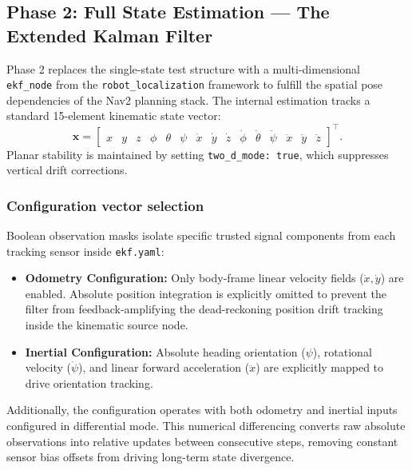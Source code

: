 \subsection{Phase 2: Full State Estimation --- The Extended Kalman Filter}
\label{subsec:ekf}

Phase 2 replaces the single-state test structure with a multi-dimensional \texttt{ekf\_node} from the \texttt{robot\_localization} framework to fulfill the spatial pose dependencies of the Nav2 planning stack. The internal estimation tracks a standard 15-element kinematic state vector:
\begin{equation}
\mathbf{x} = \begin{bmatrix} x & y & z & \phi & \theta & \psi &
\dot{x} & \dot{y} & \dot{z} & \dot{\phi} & \dot{\theta} & \dot{\psi} &
\ddot{x} & \ddot{y} & \ddot{z} \end{bmatrix}^\top.
\end{equation}
Planar stability is maintained by setting \texttt{two\_d\_mode: true}, which suppresses vertical drift corrections.

\subsubsection{Configuration vector selection}

Boolean observation masks isolate specific trusted signal components from each tracking sensor inside \texttt{ekf.yaml}:
\begin{itemize}
\item \textbf{Odometry Configuration:} Only body-frame linear velocity fields ($\dot{x}, \dot{y}$) are enabled. Absolute position integration is explicitly omitted to prevent the filter from feedback-amplifying the dead-reckoning position drift tracking inside the kinematic source node.
\item \textbf{Inertial Configuration:} Absolute heading orientation ($\psi$), rotational velocity ($\dot{\psi}$), and linear forward acceleration ($\ddot{x}$) are explicitly mapped to drive orientation tracking.
\end{itemize}

Additionally, the configuration operates with both odometry and inertial inputs configured in differential mode. This numerical differencing converts raw absolute observations into relative updates between consecutive steps, removing constant sensor bias offsets from driving long-term state divergence.

